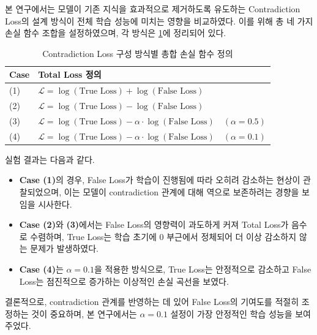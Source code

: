 \documentclass[a4paper,fleqn]{cas-sc}
\begin{document}
본 연구에서는 모델이 기존 지식을 효과적으로 제거하도록 유도하는 Contradiction Loss의 설계 방식이 전체 학습 성능에 미치는 영향을 비교하였다. 이를 위해 총 네 가지 손실 함수 조합을 설정하였으며, 각 방식은 \ref{tab:loss-designs}에 정리되어 있다.
\begin{table}[H]
    \centering
    \renewcommand{\arraystretch}{1.3}
    \caption{Contradiction Loss 구성 방식별 총합 손실 함수 정의}
    \label{tab:loss-designs}
    \begin{tabularx}{\textwidth}{>{\raggedright\arraybackslash}p{1.2cm}X}
        \toprule
        \textbf{Case} & \textbf{Total Loss 정의} \\
        \midrule
        (1) & \( \mathcal{L} = \log(\text{True Loss}) + \log(\text{False Loss}) \) \\
        (2) & \( \mathcal{L} = \log(\text{True Loss}) - \log(\text{False Loss}) \) \\
        (3) & \( \mathcal{L} = \log(\text{True Loss}) - \alpha \cdot \log(\text{False Loss}) \quad (\alpha = 0.5) \)\\
        (4) & \( \mathcal{L} = \log(\text{True Loss}) - \alpha \cdot \log(\text{False Loss}) \quad (\alpha = 0.1) \) \\
        \bottomrule
    \end{tabularx}
\end{table}
   
실험 결과는 다음과 같다.
\begin{itemize}
    \item \textbf{Case (1)}의 경우, False Loss가 학습이 진행됨에 따라 오히려 감소하는 현상이 관찰되었으며, 이는 모델이 contradiction 관계에 대해 역으로 보존하려는 경향을 보임을 시사한다.
    
    \item \textbf{Case (2)}와 \textbf{(3)}에서는 False Loss의 영향력이 과도하게 커져 Total Loss가 음수로 수렴하며, True Loss는 학습 초기에 0 부근에서 정체되어 더 이상 감소하지 않는 문제가 발생하였다.
    
    \item \textbf{Case (4)}는 \(\alpha = 0.1\)을 적용한 방식으로, True Loss는 안정적으로 감소하고 False Loss는 점진적으로 증가하는 이상적인 손실 곡선을 보였다.
\end{itemize}
    
결론적으로, contradiction 관계를 반영하는 데 있어 False Loss의 기여도를 적절히 조정하는 것이 중요하며, 본 연구에서는 \(\alpha = 0.1\) 설정이 가장 안정적인 학습 성능을 보여주었다.
\end{document}
